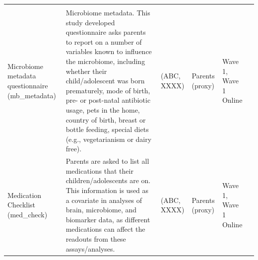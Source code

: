 \documentclass[]{book}
\begin{document}
\begin{longtable}[]{@{}llllll@{}}
\begin{minipage}[t]{0.10\columnwidth}
\strut
\end{minipage}\tabularnewline
\begin{minipage}[t]{0.18\columnwidth}\raggedright
Microbiome metadata questionnaire (mb\_metadata)\strut
\end{minipage} & \begin{minipage}[t]{0.18\columnwidth}\raggedright
Microbiome metadata. This study developed questionnaire asks parents to report on a number of variables known to influence the microbiome, including whether their child/adolescent was born prematurely, mode of birth, pre- or post-natal antibiotic usage, pets in the home, country of birth, breast or bottle feeding, special diets (e.g., vegetarianism or dairy free).\strut
\end{minipage} & \begin{minipage}[t]{0.15\columnwidth}\raggedright
(ABC, XXXX)\strut
\end{minipage} & \begin{minipage}[t]{0.16\columnwidth}\raggedright
Parents (proxy)\strut
\end{minipage} & \begin{minipage}[t]{0.06\columnwidth}\raggedright
Wave 1, Wave 1 Online\strut
\end{minipage} & \begin{minipage}[t]{0.10\columnwidth}\raggedright
\strut
\end{minipage}\tabularnewline
\begin{minipage}[t]{0.18\columnwidth}\raggedright
Medication Checklist (med\_check)\strut
\end{minipage} & \begin{minipage}[t]{0.18\columnwidth}\raggedright
Parents are asked to list all medications that their children/adolescents are on. This information is used as a covariate in analyses of brain, microbiome, and biomarker data, as different medications can affect the readouts from these assays/analyses.\strut
\end{minipage} & \begin{minipage}[t]{0.15\columnwidth}\raggedright
(ABC, XXXX)\strut
\end{minipage} & \begin{minipage}[t]{0.16\columnwidth}\raggedright
Parents (proxy)\strut
\end{minipage} & \begin{minipage}[t]{0.06\columnwidth}\raggedright
Wave 1, Wave 1 Online\strut
\end{minipage} & \begin{minipage}[t]{0.10\columnwidth}\raggedright

\end{minipage}
\end{longtable}
\end{document}
